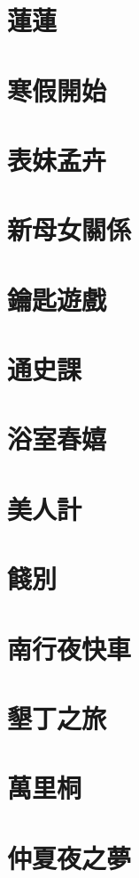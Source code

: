 \documentclass[hyperref]{ctexbook}
\begin{document}
\chapter{蓮蓮}
\chapter{寒假開始}
\chapter{表妹孟卉}
\chapter{新母女關係}
\chapter{鑰匙遊戲}
\chapter{通史課}
\chapter{浴室春嬉}
\chapter{美人計}
\chapter{餞別}
\chapter{南行夜快車}
\chapter{墾丁之旅}
\chapter{萬里桐}
\chapter{仲夏夜之夢}
\end{document}
